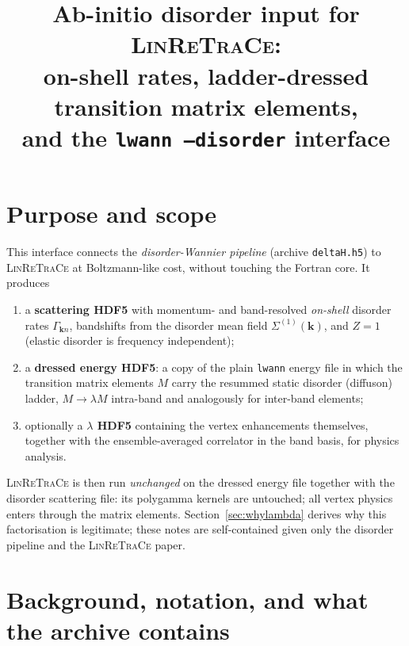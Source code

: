 \documentclass[11pt]{article}
\title{Ab-initio disorder input for \textsc{LinReTraCe}:\\
on-shell rates, ladder-dressed transition matrix elements,\\
and the \texttt{lwann --disorder} interface}
\author{}
\date{}
\newcommand{\vk}{\mathbf{k}}
\newcommand{\Gam}{\Gamma}
\begin{document}
\maketitle
\tableofcontents

\section{Purpose and scope}
This interface connects the \emph{disorder-Wannier pipeline} (archive
\texttt{deltaH.h5}) to \textsc{LinReTraCe} at Boltzmann-like cost, without
touching the Fortran core.  It produces
\begin{enumerate}
\item a \textbf{scattering HDF5} with momentum- and band-resolved
\emph{on-shell} disorder rates $\Gam_{\vk n}$, bandshifts from the
disorder mean field $\Sigma^{(1)}(\vk)$, and $Z=1$ (elastic disorder is
frequency independent);
\item a \textbf{dressed energy HDF5}: a copy of the plain
\texttt{lwann} energy file in which the transition matrix elements $M$
carry the resummed static disorder (diffuson) ladder,
$M\to\lambda M$ intra-band and analogously for inter-band elements;
\item optionally a \textbf{$\lambda$ HDF5} containing the vertex
enhancements themselves, together with the ensemble-averaged correlator
in the band basis, for physics analysis.
\end{enumerate}
\textsc{LinReTraCe} is then run \emph{unchanged} on the dressed energy
file together with the disorder scattering file: its polygamma kernels
are untouched; all vertex physics enters through the matrix elements.
Section~\ref{sec:whylambda} derives why this factorisation is
legitimate; these notes are self-contained given only the disorder
pipeline and the \textsc{LinReTraCe} paper.

\section{Background, notation, and what the archive contains}
\label{sec:background}
\end{document}
